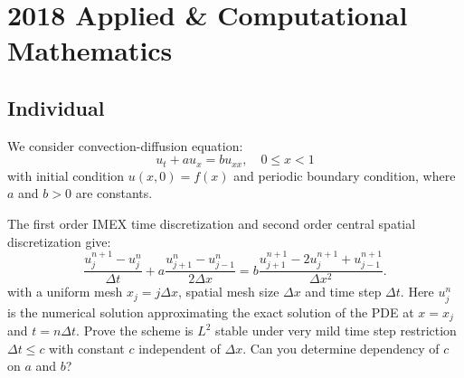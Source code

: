 \section{2018 Applied \& Computational Mathematics}

\subsection{Individual}

\begin{exercise}
\label{applied:2018:1}
We consider convection-diffusion equation:
\[
u_{t}+au_{x}=bu_{xx},\quad 0\leq x<1
\]
with initial condition $u(x,0)=f(x)$ and periodic boundary condition, where $a$ and $b>0$ are constants.

The first order IMEX time discretization and second order central spatial discretization give:
\[
\frac{u_{j}^{n+1}-u_{j}^{n}}{\Delta t}+a\frac{u_{j+1}^{n}-u_{j-1}^{n}}{2\Delta x}=b\frac{u_{j+1}^{n+1}-2u_{j}^{n+1}+u_{j-1}^{n+1}}{\Delta x^{2}}.
\]
with a uniform mesh $x_j = j\Delta x$, spatial mesh size $\Delta x$ and time step $\Delta t$. Here $u_j^n$ is the numerical solution approximating the exact solution of the PDE at $x=x_j$ and $t=n\Delta t$. Prove the scheme is $L^{2}$ stable under very mild time step restriction $\Delta t\leq c$ with constant $c$ independent of $\Delta x$. Can you determine dependency of $c$ on $a$ and $b$?
\end{exercise}


